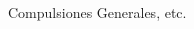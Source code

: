 \documentclass[10pt,a4paper]{article}
\author{enbeetreee}
\begin{document}
\raggedright
\raggedcolumns
\footnotesize
\begin{multicols*}{2}

Compulsiones Generales, etc.
\end{multicols*}
\end{document}

